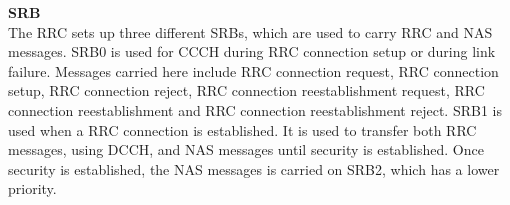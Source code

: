 \begin{table}[H]
\centering
{}
\caption{Signaling comparison between different methods \citep{REL-13}.}
\label{tab:signaling_comparison}
\end{table}

\textbf{\Gls{SRB}}\\
The \gls{RRC} sets up three different \gls{SRB}s, which are used to carry \gls{RRC} and \gls{NAS} messages. \gls{SRB}0 is used for \gls{CCCH} during \gls{RRC} connection setup or during link failure. Messages carried here include \gls{RRC} connection request, \gls{RRC} connection setup, \gls{RRC} connection reject, \gls{RRC} connection reestablishment request, \gls{RRC} connection reestablishment and \gls{RRC} connection reestablishment reject. \gls{SRB}1 is used when a \gls{RRC} connection is established. It is used to transfer both \gls{RRC} messages, using \gls{DCCH}, and \gls{NAS} messages until security is established. Once security is established, the \gls{NAS} messages is carried on \gls{SRB}2, which has a lower priority. \citep[ch. 6.6]{book_LTE_for_UMTS} 



